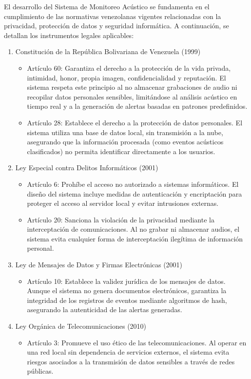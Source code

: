 
El desarrollo del Sistema de Monitoreo Acústico se fundamenta en el cumplimiento de las normativas venezolanas vigentes relacionadas con la privacidad, protección de datos y seguridad informática. A continuación, se detallan los instrumentos legales aplicables:

\begin{enumerate}
  \item Constitución de la República Bolivariana de Venezuela (1999)
        \begin{itemize}
          \item Artículo 60: Garantiza el derecho a la protección de la vida privada, intimidad, honor, propia imagen, confidencialidad y reputación. El sistema respeta este principio al no almacenar grabaciones de audio ni recopilar datos personales sensibles, limitándose al análisis acústico en tiempo real y a la generación de alertas basadas en patrones predefinidos.
          \item Artículo 28: Establece el derecho a la protección de datos personales. El sistema utiliza una base de datos local, sin transmisión a la nube, asegurando que la información procesada (como eventos acústicos clasificados) no permita identificar directamente a los usuarios.
        \end{itemize}
  \item Ley Especial contra Delitos Informáticos (2001)
        \begin{itemize}
          \item Artículo 6: Prohíbe el acceso no autorizado a sistemas informáticos. El diseño del sistema incluye medidas de autenticación y encriptación para proteger el acceso al servidor local y evitar intrusiones externas.
          \item Artículo 20: Sanciona la violación de la privacidad mediante la interceptación de comunicaciones. Al no grabar ni almacenar audios, el sistema evita cualquier forma de interceptación ilegítima de información personal.
        \end{itemize}
  \item Ley de Mensajes de Datos y Firmas Electrónicas (2001)
        \begin{itemize}
          \item Artículo 10: Establece la validez jurídica de los mensajes de datos. Aunque el sistema no genera documentos electrónicos, garantiza la integridad de los registros de eventos mediante algoritmos de hash, asegurando la autenticidad de las alertas generadas.
        \end{itemize}
  \item Ley Orgánica de Telecomunicaciones (2010)
        \begin{itemize}
          \item Artículo 3: Promueve el uso ético de las telecomunicaciones. Al operar en una red local sin dependencia de servicios externos, el sistema evita riesgos asociados a la transmisión de datos sensibles a través de redes públicas.
        \end{itemize}
\end{enumerate}

